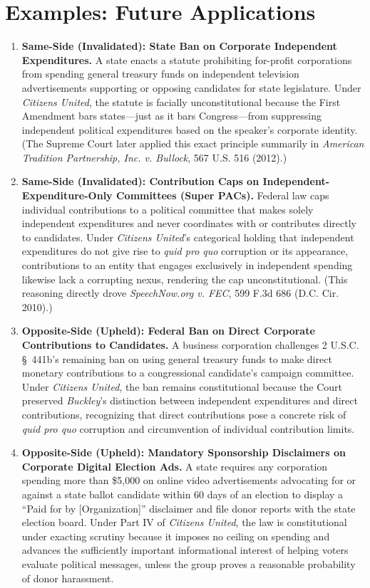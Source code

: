 \documentclass[12pt]{article}
\begin{document}
\section{Examples: Future Applications}

\begin{enumerate}
  \item \textbf{Same-Side (Invalidated): State Ban on Corporate Independent Expenditures.} A state enacts a statute prohibiting for-profit corporations from spending general treasury funds on independent television advertisements supporting or opposing candidates for state legislature. Under \textit{Citizens United}, the statute is facially unconstitutional because the First Amendment bars states---just as it bars Congress---from suppressing independent political expenditures based on the speaker's corporate identity. (The Supreme Court later applied this exact principle summarily in \textit{American Tradition Partnership, Inc. v. Bullock}, 567 U.S. 516 (2012).)
  \item \textbf{Same-Side (Invalidated): Contribution Caps on Independent-Expenditure-Only Committees (Super PACs).} Federal law caps individual contributions to a political committee that makes solely independent expenditures and never coordinates with or contributes directly to candidates. Under \textit{Citizens United}'s categorical holding that independent expenditures do not give rise to \textit{quid pro quo} corruption or its appearance, contributions to an entity that engages exclusively in independent spending likewise lack a corrupting nexus, rendering the cap unconstitutional. (This reasoning directly drove \textit{SpeechNow.org v. FEC}, 599 F.3d 686 (D.C. Cir. 2010).)
  \item \textbf{Opposite-Side (Upheld): Federal Ban on Direct Corporate Contributions to Candidates.} A business corporation challenges 2 U.S.C. \S~441b's remaining ban on using general treasury funds to make direct monetary contributions to a congressional candidate's campaign committee. Under \textit{Citizens United}, the ban remains constitutional because the Court preserved \textit{Buckley}'s distinction between independent expenditures and direct contributions, recognizing that direct contributions pose a concrete risk of \textit{quid pro quo} corruption and circumvention of individual contribution limits.
  \item \textbf{Opposite-Side (Upheld): Mandatory Sponsorship Disclaimers on Corporate Digital Election Ads.} A state requires any corporation spending more than \$5,000 on online video advertisements advocating for or against a state ballot candidate within 60 days of an election to display a ``Paid for by [Organization]'' disclaimer and file donor reports with the state election board. Under Part IV of \textit{Citizens United}, the law is constitutional under exacting scrutiny because it imposes no ceiling on spending and advances the sufficiently important informational interest of helping voters evaluate political messages, unless the group proves a reasonable probability of donor harassment.

\end{enumerate}
\end{document}

